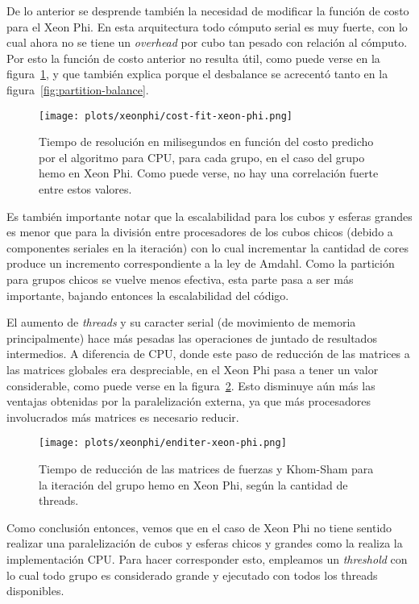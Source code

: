 De lo anterior se desprende tambi\'en la necesidad de modificar la funci\'on de costo
para el Xeon Phi. En esta arquitectura todo c\'omputo serial es muy fuerte, con
lo cual ahora no se tiene un \textit{overhead} por cubo tan pesado con relaci\'on
al c\'omputo. Por esto la funci\'on de costo anterior no resulta \'util, como
puede verse en la figura~\ref{fig:cost-function-xeon-phi}, y que tambi\'en explica
porque el desbalance se acrecent\'o tanto en la figura~\ref{fig:partition-balance}.

\begin{figure}[htbp]
   \centering
   \texttt{[image: plots/xeonphi/cost-fit-xeon-phi.png]}
   \caption{Tiempo de resoluci\'on en milisegundos en funci\'on del costo predicho
   por el algoritmo para CPU, para cada grupo, en el caso del grupo hemo en Xeon Phi.
   Como puede verse, no hay una correlaci\'on fuerte entre estos valores.}
   \label{fig:cost-function-xeon-phi}
\end{figure}

Es tambi\'en importante notar que la escalabilidad para los cubos
y esferas grandes es menor que para la divisi\'on entre procesadores de los cubos
chicos (debido a componentes seriales
en la iteraci\'on) con lo cual incrementar la cantidad de cores produce un
incremento correspondiente a la ley de Amdahl. Como la partici\'on para grupos
chicos se vuelve menos efectiva, esta parte pasa a ser m\'as importante, bajando
entonces la escalabilidad del c\'odigo.

El aumento de \textit{threads} y su caracter serial (de movimiento de memoria
principalmente) hace m\'as pesadas las operaciones de juntado de resultados intermedios.
A diferencia de CPU, donde este paso de reducci\'on de las matrices a las matrices
globales era despreciable, en el Xeon Phi pasa a tener un valor considerable, como
puede verse en la figura~\ref{fig:enditer-xeon-phi}. Esto disminuye a\'un m\'as
las ventajas obtenidas por la paralelizaci\'on externa, ya que m\'as procesadores
involucrados m\'as matrices es necesario reducir.

\begin{figure}[htbp]
   \centering
   \texttt{[image: plots/xeonphi/enditer-xeon-phi.png]}
   \caption{Tiempo de reducci\'on de las matrices de fuerzas y Khom-Sham para
   la iteraci\'on del grupo hemo en Xeon Phi, seg\'un la cantidad de threads.}
   \label{fig:enditer-xeon-phi}
\end{figure}

Como conclusi\'on entonces, vemos que en el caso de Xeon Phi no tiene sentido
realizar una paralelizaci\'on de cubos y esferas chicos y grandes como la realiza
la implementaci\'on CPU. Para hacer corresponder esto, empleamos un \textit{threshold}
con lo cual todo grupo es considerado grande y ejecutado con todos los
threads disponibles.

